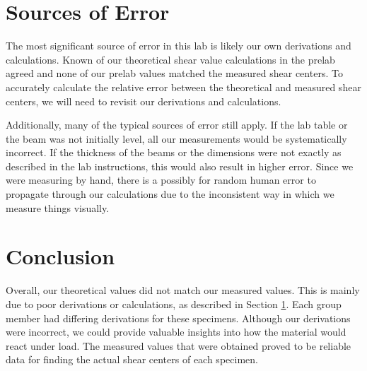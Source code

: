 \documentclass[12 pt]{report}
\begin{document}
\section{Sources of Error}\label{sources_of_error}
The most significant source of error in this lab is likely our own derivations and calculations. Known of our theoretical shear value calculations in the prelab agreed and none of our prelab values matched the measured shear centers. To accurately calculate the relative error between the theoretical and measured shear centers, we will need to revisit our derivations and calculations.

Additionally, many of the typical sources of error still apply. If the lab table or the beam was not initially level, all our measurements would be systematically incorrect. If the thickness of the beams or the dimensions were not exactly as described in the lab instructions, this would also result in higher error. Since we were measuring by hand, there is a possibly for random human error to propagate through our calculations due to the inconsistent way in which we measure things visually.

\section{Conclusion} \label{conclusion-section}
Overall, our theoretical values did not match our measured values. This is mainly due to poor derivations or calculations, as described in Section \ref{sources_of_error}. Each group member had differing derivations for these specimens. Although our derivations were incorrect, we could provide valuable insights into how the material would react under load. The measured values that were obtained proved to be reliable data for finding the actual shear centers of each specimen.

\printbibliography[heading=subbibintoc]
\appendix
\end{document}
